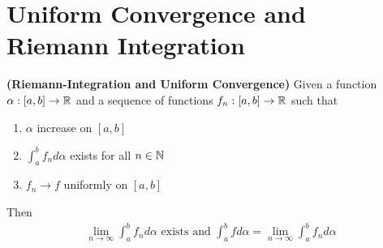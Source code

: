 \documentclass{report}
\begin{document}
\section{Uniform Convergence and Riemann Integration}
\begin{theorem}
\label{RIFac}
\textbf{(Riemann-Integration and Uniform Convergence)} Given a function $\alpha :[a,b]\rightarrow \mathbb{R}$ and a sequence of functions $f_n:[a,b]\rightarrow \mathbb{R}$ such that 
\begin{enumerate}[label=(\alph*)]
  \item $\alpha $ increase on $[a,b]$ 
  \item $\int_a^b f_nd\alpha $ exists for all $n\in\mathbb{N}$ 
  \item $f_n \to f $ uniformly on $[a,b]$ 
\end{enumerate}
Then 
\begin{align*}
  \lim_{n\to \infty}\int_a^b f_n d\alpha \text{ exists and }\int_a^b fd\alpha =\lim_{n\to \infty}\int_a^b f_nd\alpha 
\end{align*}
\end{theorem}
\end{document}
